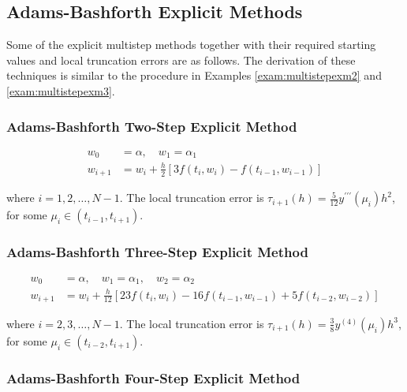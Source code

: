 \subsection*{Adams-Bashforth Explicit Methods}
Some of the explicit multistep methods together with their required starting values and local truncation errors are as follows. The derivation of these techniques is similar to the procedure in Examples \ref{exam:multistepexm2} and \ref{exam:multistepexm3}.

\subsubsection*{Adams-Bashforth Two-Step Explicit Method}

\begin{equation}\label{eqn:multistepeq13}
\begin{split}
w_{0} & =\alpha, \quad w_{1}=\alpha_{1} \\
w_{i+1} & =w_{i}+\frac{h}{2}\left[3 f\left(t_{i}, w_{i}\right)-f\left(t_{i-1}, w_{i-1}\right)\right]
\end{split}
\end{equation}

where $i=1,2, \ldots, N-1$. The local truncation error is $\tau_{i+1}(h)=\frac{5}{12} y^{\prime \prime \prime}\left(\mu_{i}\right) h^{2}$, for some $\mu_{i} \in\left(t_{i-1}, t_{i+1}\right)$.

\subsubsection*{Adams-Bashforth Three-Step Explicit Method}

\begin{equation}\label{eqn:multistepeq14}
\begin{split}
w_{0} & =\alpha, \quad w_{1}=\alpha_{1}, \quad w_{2}=\alpha_{2} \\
w_{i+1} & =w_{i}+\frac{h}{12}\left[23 f\left(t_{i}, w_{i}\right)-16 f\left(t_{i-1}, w_{i-1}\right)+5 f\left(t_{i-2}, w_{i-2}\right)\right] 
\end{split}
\end{equation}

where $i=2,3, \ldots, N-1$. The local truncation error is $\tau_{i+1}(h)=\frac{3}{8} y^{(4)}\left(\mu_{i}\right) h^{3}$, for some $\mu_{i} \in\left(t_{i-2}, t_{i+1}\right)$.

\subsubsection*{Adams-Bashforth Four-Step Explicit Method}

